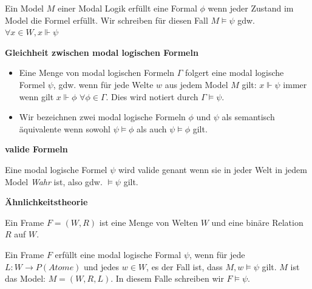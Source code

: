 \begin{definition}
	\label{def:model_erfuellt}
	Ein Model $M$ einer Modal Logik erfüllt eine Formal $\phi$ wenn jeder Zustand im Model die Formel erfüllt.
	Wir schreiben für diesen Fall $M \vDash \psi$ gdw. $\forall x \in W, x \Vdash \psi$
\end{definition}
\cite[S.310f]{huth2004logic}




\textbf{Gleichheit zwischen modal logischen Formeln}
\begin{definition}
	\label{def:model_folgert}
	\begin{itemize}
		\item Eine Menge von modal logischen Formeln $\Gamma$ folgert eine modal logische Formel $\psi$, gdw. wenn für jede Welte $w$ aus jedem Model $M$ gilt: $x \Vdash \psi$ immer wenn gilt $x \Vdash \phi$ $\forall \phi \in \Gamma$. 
		Dies wird notiert durch $\Gamma \vDash \psi$.
		\item Wir bezeichnen zwei modal logische Formeln $\phi$ und $\psi$ als semantisch äquivalente wenn sowohl $\psi \vDash \phi$ als auch $\psi \vDash \phi$ gilt.
	\end{itemize}	
\end{definition}
\cite[S.313]{huth2004logic}

\textbf{valide Formeln}
\begin{definition}
	\label{def:valide}
	Eine modal logische Formel $\psi$ wird valide genant wenn sie in jeder Welt in jedem Model \emph{Wahr} ist, also gdw. $\vDash \psi$ gilt.
\end{definition}
\cite[S.314]{huth2004logic}


\textbf{Ähnlichkeitstheorie}
\begin{definition}
	\label{def:frame}
	Ein Frame $F = (W,R)$ ist eine Menge von Welten $W$ und eine binäre Relation $R$ auf $W$.
\end{definition}
\cite[S.322]{huth2004logic}


\begin{definition}
	\label{def:frame_erfuellt}
	Ein Frame $F$ erfüllt eine modal logische Formal $\psi$, wenn für jede  $L: W \rightarrow P(Atome)$ und jedes $w \in W$, es der Fall ist, dass $M,w \vDash \psi$ gilt. $M$ ist das Model: $M = (W,R,L)$.
	In diesem Falle schreiben wir $F \vDash \psi$.
\end{definition}
\cite[S.322f]{huth2004logic}

